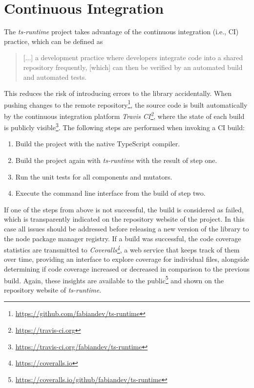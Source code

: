 \section{Continuous Integration}
\label{sec:continuous-integration}

The \emph{ts-runtime} project takes advantage of the continuous integration (i.e., CI) practice, which can be defined as
\begin{quote}
  [...] a development practice where developers integrate code into a shared repository frequently, [which] can then be verified by an automated build and automated tests.~\cite{ContinuousIntegration:Codeship}%
\end{quote}
This reduces the risk of introducing errors to the library accidentally. When pushing changes to the remote repository\footnote{\url{https://github.com/fabiandev/ts-runtime}}, the source code is built automatically by the continuous integration platform \emph{Travis CI\footnote{\url{https://travis-ci.org}}}, where the state of each build is publicly visible\footnote{\url{https://travis-ci.org/fabiandev/ts-runtime}}. The following steps are performed when invoking a CI build:
\begin{enumerate}
  \item Build the project with the native TypeScript compiler.
  \item Build the project again with \emph{ts-runtime} with the result of step one.
  \item Run the unit tests for all components and mutators.
  \item Execute the command line interface from the build of step two.
\end{enumerate}
If one of the steps from above is not successful, the build is considered as failed, which is transparently indicated on the repository website of the project. In this case all issues should be addressed before releasing a new version of the library to the node package manager registry. If a build was successful, the code coverage statistics are transmitted to \emph{Coveralls\footnote{\url{https://coveralls.io}}}, a web service that keeps track of them over time, providing an interface to explore coverage for individual files, alongside determining if code coverage increased or decreased in comparison to the previous build. Again, these insights are available to the public\footnote{\url{https://coveralls.io/github/fabiandev/ts-runtime}} and shown on the repository website of \emph{ts-runtime}.


